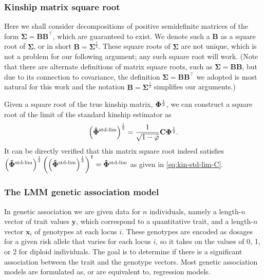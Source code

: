 \documentclass[11pt]{article}
\newcommand{\kinMat}{%
  \ensuremath{%
    \mathbf{\Phi}
  }%
  \xspace%
}%
\newcommand{\kinMatStdLim}{%
  \ensuremath{%
    \mathbf{\hat{\Phi}}^\text{std-lim}
  }%
  \xspace%
}%
\begin{document}
\subsubsection{Kinship matrix square root}


Here we shall consider decompositions of positive semidefinite matrices of the form $\mathbf{\Sigma} = \mathbf{B} \mathbf{B}^\intercal$, which are guaranteed to exist.
We denote such a $\mathbf{B}$ as a square root of $\mathbf{\Sigma}$, or in short $\mathbf{B} = \mathbf{\Sigma}^\frac{1}{2}$.
These square roots of $\mathbf{\Sigma}$ are not unique, which is not a problem for our following argument; any such square root will work.
(Note that there are alternate definitions of matrix square roots, such as $\mathbf{\Sigma} = \mathbf{B} \mathbf{B}$, but due to its connection to covariance, the definition $\mathbf{\Sigma} = \mathbf{B} \mathbf{B}^\intercal$ we adopted is most natural for this work and the notation $\mathbf{B} = \mathbf{\Sigma}^\frac{1}{2}$ simplifies our arguments.)

Given a square root of the true kinship matrix, $\kinMat^\frac{1}{2}$, we can construct a square root of the limit of the standard kinship estimator as
\begin{equation}
  \label{eq:eq:kin-std-lim-C-sqrt}
  \left( \kinMatStdLim \right)^\frac{1}{2}
  =
  \frac{1}{ \sqrt{ 1 - \bar{\varphi} } }
  \mathbf{C} \kinMat^\frac{1}{2}
  .
\end{equation}
It can be directly verified that this matrix square root indeed satisfies
$\left( \kinMatStdLim \right)^\frac{1}{2} \left( \left( \kinMatStdLim \right)^\frac{1}{2} \right)^\intercal = \kinMatStdLim$
as given in \cref{eq:kin-std-lim-C}.

\subsubsection{The LMM genetic association model}

In genetic association we are given data for $n$ individuals, namely a length-$n$ vector of trait values $\mathbf{y}$, which correspond to a quantitative trait, and a length-$n$ vector $\mathbf{x}_i$ of genotypes at each locus $i$.
These genotypes are encoded as dosages for a given risk allele that varies for each locus $i$, so it takes on the values of 0, 1, or 2 for diploid individuals.
The goal is to determine if there is a significant association between the trait and the genotype vectors.
Most genetic association models are formulated as, or are equivalent to, regression models.
\end{document}
